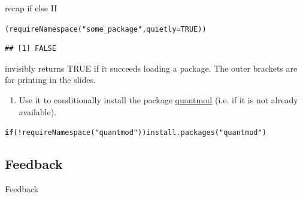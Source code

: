 \documentclass[xcolor=table,       handout,    xcolor=dvipsnames]{beamer}\usepackage[]{graphicx}\usepackage[]{color}
\makeatletter
\newcommand{\hlnum}[1]{\textcolor[rgb]{0,0,0}{#1}}
\newcommand{\hlstr}[1]{\textcolor[rgb]{0.545,0.137,0.137}{#1}}
\newcommand{\hlopt}[1]{\textcolor[rgb]{0,0,0}{#1}}
\newcommand{\hlstd}[1]{\textcolor[rgb]{0,0,0}{#1}}
\newcommand{\hlkwa}[1]{\textcolor[rgb]{1,0,0}{\textbf{#1}}}
\newcommand{\hlkwc}[1]{\textcolor[rgb]{1,0,1}{#1}}
\newcommand{\hlkwd}[1]{\textcolor[rgb]{0,0,1}{#1}}
\newenvironment{kframe}{%
 \def\at@end@of@kframe{}%
 \ifinner\ifhmode%
  \def\at@end@of@kframe{\end{minipage}}%
  \begin{minipage}{\columnwidth}%
 \fi\fi%
 \def\FrameCommand##1{\hskip\@totalleftmargin \hskip-\fboxsep
 \colorbox{shadecolor}{##1}\hskip-\fboxsep
     \hskip-\linewidth \hskip-\@totalleftmargin \hskip\columnwidth}%
 \MakeFramed {\advance\hsize-\width
   \@totalleftmargin\z@ \linewidth\hsize
   \@setminipage}}%
 {\par\unskip\endMakeFramed%
 \at@end@of@kframe}
\newenvironment{knitrout}{}{} %
\makeatother
\begin{document}
\begin{frame}[fragile]{recap \alert{if else} II}
\begin{knitrout}
\color{fgcolor}\begin{kframe}
\begin{alltt}
\hlstd{(}  \hlkwd{requireNamespace}\hlstd{(}\hlstr{"some_package"}\hlstd{,} \hlkwc{quietly}\hlstd{=}\hlnum{TRUE}\hlstd{)  )}
\end{alltt}
\begin{verbatim}
## [1] FALSE
\end{verbatim}
\end{kframe}
\end{knitrout}
invisibly returns TRUE if it succeeds loading a package. The outer brackets are for printing in the slides.
\begin{enumerate}
\item Use it to conditionally install the package \href{https://cran.r-project.org/package=quantmod}{quantmod} (i.e. if it is not already available).
\end{enumerate}
\pause
\begin{knitrout}\small
{}\color{fgcolor}\begin{kframe}
\begin{alltt}
\hlkwa{if}\hlstd{(}\hlopt{!}\hlkwd{requireNamespace}\hlstd{(}\hlstr{"quantmod"}\hlstd{))} \hlkwd{install.packages}\hlstd{(}\hlstr{"quantmod"}\hlstd{)}
\end{alltt}


{\ttfamily\noindent\itshape\color{messagecolor}{\#\# Loading required namespace: quantmod}}\end{kframe}
\end{knitrout}
\end{frame}

\subsection{Feedback}

\begin{frame}{Feedback}
\end{frame}
\end{document}
